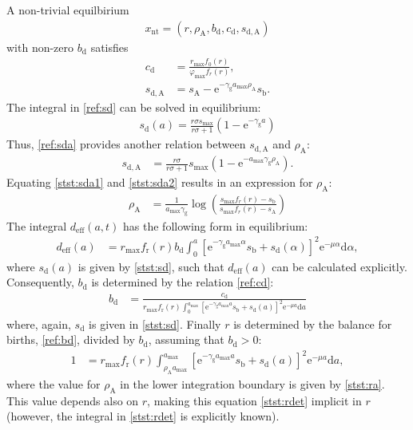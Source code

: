\documentclass[11pt]{scrartcl}
\renewcommand{\phi}{\varphi}
\newcommand{\e}{\mathrm{e}}
\renewcommand{\d}{\mathrm{d}}
\newcommand{\bd}{b_\mathrm{d}}
\newcommand{\cd}{c_\mathrm{d}}
\newcommand{\sd}{s_\mathrm{d}}
\newcommand{\fr}{f_\mathrm{r}}
\newcommand{\rmax}{r_\mathrm{max}}
\newcommand{\amax}{{a_\mathrm{max}}}
\newcommand{\szmax}{{s_\mathrm{max}}}
\newcommand{\fmax}{\phi_\mathrm{max}}
\newcommand{\sda}{s_\mathrm{d,A}}
\newcommand{\sza}{s_\mathrm{A}}
\newcommand{\szb}{s_\mathrm{b}}
\newcommand{\ra}{\rho_\mathrm{A}}
\newcommand{\deff}{d_\mathrm{eff}}
\renewcommand{\gg}{\gamma_\mathrm{g}}
\begin{document}
A non-trivial equilbirium
\begin{align*}
  x_\mathrm{nt}=(r,\ra,\bd,\cd,\sda)
\end{align*}
with non-zero $\bd$ satisfies
\begin{align}
  \cd&=\frac{\rmax f_0(r)}{\fmax f_r(r)}\label{stst:cd},\\
  \sda&=\sza-\e^{-\gg\amax\ra}\szb\label{stst:sda1}.
\end{align}
The integral in \eqref{ref:sd} can be solved in equilibrium:
\begin{align}\label{stst:sd}
  \sd(a)=\frac{r\sigma\szmax}{r\sigma + 1}\left(1-\e^{-\gg a}\right)
\end{align}
Thus, \eqref{ref:sda} provides another relation between $\sda$ and $\ra$:
\begin{align}
  \sda&=\frac{r\sigma}{r\sigma + 1}\szmax(1-\e^{-\amax\gg\ra}).\label{stst:sda2}
\end{align}
Equating \eqref{stst:sda1} and \eqref{stst:sda2} results in an expression for $\ra$:
\begin{align}
  \label{stst:ra}
  \ra&=\frac{1}{\amax\gg}\log\left(\frac{\szmax f_r(r)-\szb}{\szmax f_r(r)-\sza}\right)
\end{align}
The integral $\deff(a,t)$ has the following form in equilibrium:
\begin{align}
  \label{stst:deff}
  \deff(a)&=\rmax\fr(r)\bd\int_0^a\left[\e^{-\gg\amax \alpha}\szb+\sd(\alpha)\right]^2\e^{-\mu \alpha}\d \alpha,
\end{align}
where $\sd(a)$ is given by \eqref{stst:sd}, such that $\deff(a)$ can be calculated explicitly.
Consequently, $\bd$ is determined by the relation \eqref{ref:cd}:
\begin{align}
  \label{stst:bd}
  \bd&=\frac{\cd}{\rmax\fr(r)\int_0^{\amax}\left[\e^{-\gg\amax a}\szb+\sd(a)\right]^2\e^{-\mu a}\d a}
\end{align}
where, again, $\sd$ is given in \eqref{stst:sd}. Finally $r$ is determined by the balance for births, \eqref{ref:bd}, divided by $\bd$, assuming that $\bd>0$:
\begin{align}
  \label{stst:rdet}
  1&=\rmax\fr(r)\int_{\ra\amax}^{\amax}\left[\e^{-\gg\amax a}\szb+\sd(a)\right]^2\e^{-\mu a}\d a,
\end{align}
where the value for $\ra$ in the lower integration boundary is given by \eqref{stst:ra}. This value depends also on $r$, making this equation \eqref{stst:rdet} implicit in $r$ (however, the integral in \eqref{stst:rdet} is explicitly known).

\end{document}
